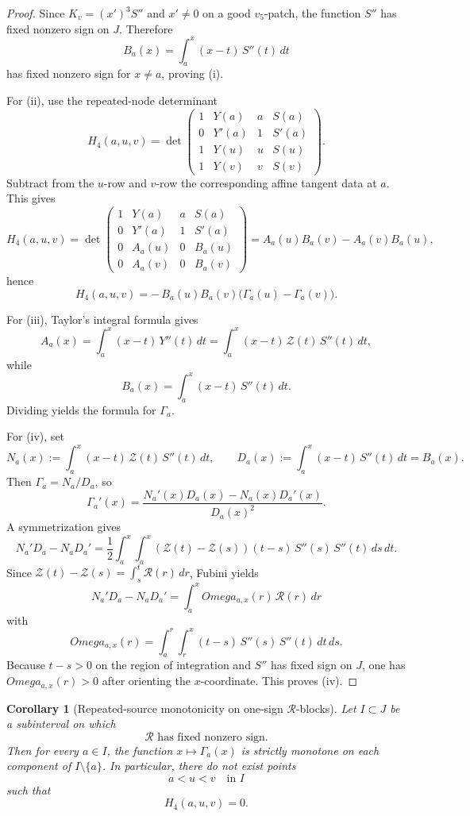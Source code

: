 \documentclass[11pt,a4paper]{amsart}
\def\Omega{Omega}%
\theoremstyle{plain}
\newtheorem{corollary}[theorem]{Corollary}
\theoremstyle{definition}
\begin{document}
\begin{proof}
Since $K_v=(x')^3S''$ and $x'\neq 0$ on a good $v_5$-patch, the function
$S''$ has fixed nonzero sign on $J$. Therefore
\[
B_a(x)=\int_a^x (x-t)\,S''(t)\,dt
\]
has fixed nonzero sign for $x\neq a$, proving (i).

For (ii), use the repeated-node determinant
\[
H_4(a,u,v)=
\det\!\begin{pmatrix}
1&Y(a)&a&S(a)\\
0&Y'(a)&1&S'(a)\\
1&Y(u)&u&S(u)\\
1&Y(v)&v&S(v)
\end{pmatrix}.
\]
Subtract from the $u$-row and $v$-row the corresponding affine tangent data
at $a$. This gives
\[
H_4(a,u,v)
=
\det\!\begin{pmatrix}
1&Y(a)&a&S(a)\\
0&Y'(a)&1&S'(a)\\
0&A_a(u)&0&B_a(u)\\
0&A_a(v)&0&B_a(v)
\end{pmatrix}
=
A_a(u)B_a(v)-A_a(v)B_a(u),
\]
hence
\[
H_4(a,u,v)
=
-\,B_a(u)B_a(v)\bigl(\Gamma_a(u)-\Gamma_a(v)\bigr).
\]

For (iii), Taylor's integral formula gives
\[
A_a(x)=\int_a^x (x-t)\,Y''(t)\,dt
=
\int_a^x (x-t)\,\mathcal Z(t)\,S''(t)\,dt,
\]
while
\[
B_a(x)=\int_a^x (x-t)\,S''(t)\,dt.
\]
Dividing yields the formula for $\Gamma_a$.

For (iv), set
\[
N_a(x):=\int_a^x (x-t)\,\mathcal Z(t)\,S''(t)\,dt,
\qquad
D_a(x):=\int_a^x (x-t)\,S''(t)\,dt=B_a(x).
\]
Then $\Gamma_a=N_a/D_a$, so
\[
\Gamma_a'(x)=\frac{N_a'(x)D_a(x)-N_a(x)D_a'(x)}{D_a(x)^2}.
\]
A symmetrization gives
\[
N_a'D_a-N_aD_a'
=
\frac12\int_a^x\!\!\int_a^x
(\mathcal Z(t)-\mathcal Z(s))(t-s)\,S''(s)\,S''(t)\,ds\,dt.
\]
Since $\mathcal Z(t)-\mathcal Z(s)=\int_s^t \mathcal R(r)\,dr$, Fubini yields
\[
N_a'D_a-N_aD_a'
=
\int_a^x \Omega_{a,x}(r)\,\mathcal R(r)\,dr
\]
with
\[
\Omega_{a,x}(r)
=
\int_a^r\!\!\int_r^x (t-s)\,S''(s)\,S''(t)\,dt\,ds.
\]
Because $t-s>0$ on the region of integration and $S''$ has fixed sign on
$J$, one has $\Omega_{a,x}(r)>0$ after orienting the $x$-coordinate.
This proves (iv).
\end{proof}

\begin{corollary}[Repeated-source monotonicity on one-sign $\mathcal R$-blocks]
\label{cor:repeated-source-monotonicity-one-sign-R}
Let $I\subset J$ be a subinterval on which
\[
\mathcal R \text{ has fixed nonzero sign.}
\]
Then for every $a\in I$, the function $x\mapsto \Gamma_a(x)$ is strictly
monotone on each component of $I\setminus\{a\}$. In particular, there do not
exist points
\[
a<u<v \quad \text{in } I
\]
such that
\[
H_4(a,u,v)=0.
\]
\end{corollary}
\end{document}
